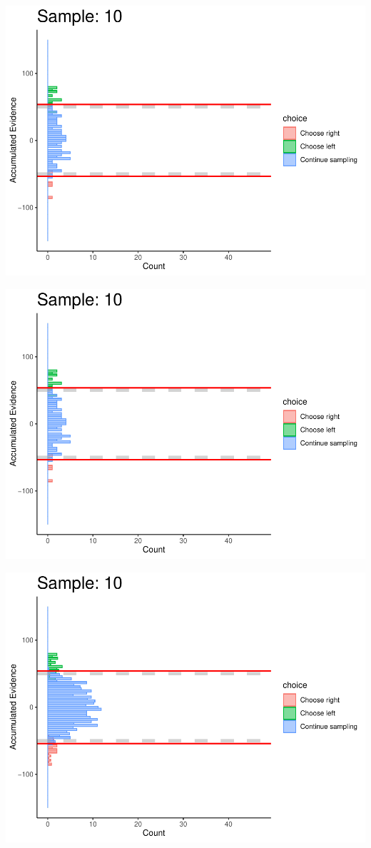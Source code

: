 \documentclass[
]{book}
\begin{document}
\begin{center}\includegraphics[width=0.8\linewidth]{LateNightBayes_files/figure-latex/fixed_dcb-94} \end{center}

\begin{center}\includegraphics[width=0.8\linewidth]{LateNightBayes_files/figure-latex/fixed_dcb-95} \end{center}

\begin{center}\includegraphics[width=0.8\linewidth]{LateNightBayes_files/figure-latex/fixed_dcb-96} \end{center}
\end{document}
